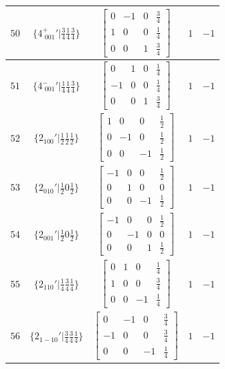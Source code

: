 \documentclass[fleqn,8pt]{jsarticle}
\begin{document}
\begin{longtable}{ccccc}
$ 50 $ & $ \{4^{+}_{\,\,001}{}'|\frac{3}{4} \frac{1}{4} \frac{3}{4}\} $ & $ \begin{bmatrix} 0 & -1 & 0 & \frac{3}{4} \\ 1 & 0 & 0 & \frac{1}{4} \\ 0 & 0 & 1 & \frac{3}{4} \end{bmatrix} $ & $ 1 $ & $ -1 $ \\ \hline
$ 51 $ & $ \{4^{-}_{\,\,001}{}'|\frac{1}{4} \frac{1}{4} \frac{3}{4}\} $ & $ \begin{bmatrix} 0 & 1 & 0 & \frac{1}{4} \\ -1 & 0 & 0 & \frac{1}{4} \\ 0 & 0 & 1 & \frac{3}{4} \end{bmatrix} $ & $ 1 $ & $ -1 $ \\ \hline
$ 52 $ & $ \{2{}_{100}{}'|\frac{1}{2} \frac{1}{2} \frac{1}{2}\} $ & $ \begin{bmatrix} 1 & 0 & 0 & \frac{1}{2} \\ 0 & -1 & 0 & \frac{1}{2} \\ 0 & 0 & -1 & \frac{1}{2} \end{bmatrix} $ & $ 1 $ & $ -1 $ \\ \hline
$ 53 $ & $ \{2{}_{010}{}'|\frac{1}{2} 0 \frac{1}{2}\} $ & $ \begin{bmatrix} -1 & 0 & 0 & \frac{1}{2} \\ 0 & 1 & 0 & 0 \\ 0 & 0 & -1 & \frac{1}{2} \end{bmatrix} $ & $ 1 $ & $ -1 $ \\ \hline
$ 54 $ & $ \{2{}_{001}{}'|\frac{1}{2} 0 \frac{1}{2}\} $ & $ \begin{bmatrix} -1 & 0 & 0 & \frac{1}{2} \\ 0 & -1 & 0 & 0 \\ 0 & 0 & 1 & \frac{1}{2} \end{bmatrix} $ & $ 1 $ & $ -1 $ \\ \hline
$ 55 $ & $ \{2{}_{110}{}'|\frac{1}{4} \frac{3}{4} \frac{1}{4}\} $ & $ \begin{bmatrix} 0 & 1 & 0 & \frac{1}{4} \\ 1 & 0 & 0 & \frac{3}{4} \\ 0 & 0 & -1 & \frac{1}{4} \end{bmatrix} $ & $ 1 $ & $ -1 $ \\ \hline
$ 56 $ & $ \{2{}_{1-10}{}'|\frac{3}{4} \frac{3}{4} \frac{1}{4}\} $ & $ \begin{bmatrix} 0 & -1 & 0 & \frac{3}{4} \\ -1 & 0 & 0 & \frac{3}{4} \\ 0 & 0 & -1 & \frac{1}{4} \end{bmatrix} $ & $ 1 $ & $ -1 $ \\ \hline

\end{longtable}
\end{document}

